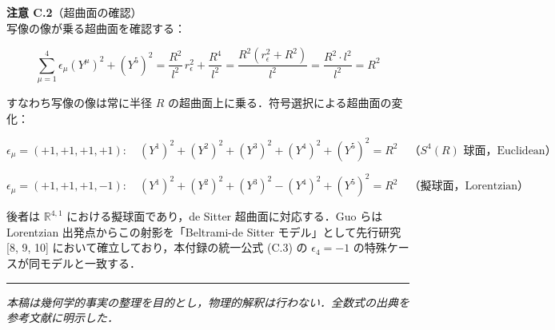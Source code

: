 \documentclass[a4paper,11pt]{ltjsarticle}
\theoremstyle{definition}
\begin{document}
\textbf{注意 C.2}（超曲面の確認）\\
写像の像が乗る超曲面を確認する：

\[\sum_{\mu=1}^4 \epsilon_\mu (Y^\mu)^2 + (Y^5)^2 = \frac{R^2}{l^2}\,r_\epsilon^2 + \frac{R^4}{l^2} = \frac{R^2(r_\epsilon^2 + R^2)}{l^2} = \frac{R^2 \cdot l^2}{l^2} = R^2 \tag{C.6}\]

すなわち写像の像は常に半径 \(R\) の超曲面上に乗る．符号選択による超曲面の変化：

\[\epsilon_\mu = (+1,+1,+1,+1): \quad (Y^1)^2+(Y^2)^2+(Y^3)^2+(Y^4)^2+(Y^5)^2 = R^2 \quad \text{（$S^4(R)$ 球面，Euclidean）}\]

\[\epsilon_\mu = (+1,+1,+1,-1): \quad (Y^1)^2+(Y^2)^2+(Y^3)^2-(Y^4)^2+(Y^5)^2 = R^2 \quad \text{（擬球面，Lorentzian）}\]

後者は \(\mathbb{R}^{4,1}\) における擬球面であり，de Sitter 超曲面に対応する．Guo らは Lorentzian 出発点からこの射影を「Beltrami-de Sitter モデル」として先行研究 {[}8, 9, 10{]} において確立しており，本付録の統一公式 (C.3) の \(\epsilon_4 = -1\) の特殊ケースが同モデルと一致する．

\begin{center}\rule{0.5\linewidth}{0.5pt}\end{center}

\emph{本稿は幾何学的事実の整理を目的とし，物理的解釈は行わない．全数式の出典を参考文献に明示した．}
\end{document}

